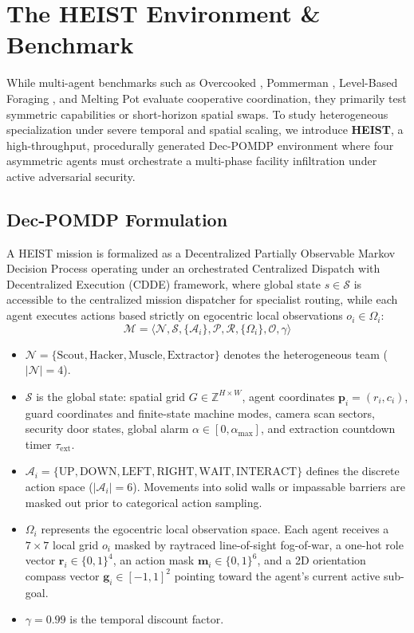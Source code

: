 \section{The HEIST Environment \& Benchmark}
\label{sec:env}

While multi-agent benchmarks such as Overcooked \citep{carroll2019utility}, Pommerman \citep{resnick2018pommerman}, Level-Based Foraging \citep[LBF;][]{papoudakis2021benchmarking}, and Melting Pot \citep{leibo2021scalable} evaluate cooperative coordination, they primarily test symmetric capabilities or short-horizon spatial swaps. To study heterogeneous specialization under severe temporal and spatial scaling, we introduce \textbf{HEIST}, a high-throughput, procedurally generated Dec-POMDP environment where four asymmetric agents must orchestrate a multi-phase facility infiltration under active adversarial security.

\subsection{Dec-POMDP Formulation}
A HEIST mission is formalized as a Decentralized Partially Observable Markov Decision Process operating under an orchestrated Centralized Dispatch with Decentralized Execution (CDDE) framework, where global state $s \in \mathcal{S}$ is accessible to the centralized mission dispatcher for specialist routing, while each agent executes actions based strictly on egocentric local observations $o_i \in \Omega_i$:
\begin{equation}
\mathcal{M} = \langle \mathcal{N}, \mathcal{S}, \{\mathcal{A}_i\}, \mathcal{P}, \mathcal{R}, \{\Omega_i\}, \mathcal{O}, \gamma \rangle
\end{equation}
\begin{itemize}[leftmargin=*,nosep]
    \item $\mathcal{N} = \{\text{Scout}, \text{Hacker}, \text{Muscle}, \text{Extractor}\}$ denotes the heterogeneous team ($|\mathcal{N}| = 4$).
    \item $\mathcal{S}$ is the global state: spatial grid $G \in \mathbb{Z}^{H \times W}$, agent coordinates $\mathbf{p}_i = (r_i, c_i)$, guard coordinates and finite-state machine modes, camera scan sectors, security door states, global alarm $\alpha \in [0, \alpha_{\max}]$, and extraction countdown timer $\tau_{\text{ext}}$.
    \item $\mathcal{A}_i = \{\text{UP}, \text{DOWN}, \text{LEFT}, \text{RIGHT}, \text{WAIT}, \text{INTERACT}\}$ defines the discrete action space ($|\mathcal{A}_i| = 6$). Movements into solid walls or impassable barriers are masked out prior to categorical action sampling.
    \item $\Omega_i$ represents the egocentric local observation space. Each agent receives a $7 \times 7$ local grid $o_i$ masked by raytraced line-of-sight fog-of-war, a one-hot role vector $\mathbf{r}_i \in \{0,1\}^4$, an action mask $\mathbf{m}_i \in \{0,1\}^6$, and a 2D orientation compass vector $\mathbf{g}_i \in [-1, 1]^2$ pointing toward the agent's current active sub-goal.
    \item $\gamma = 0.99$ is the temporal discount factor.
\end{itemize}

